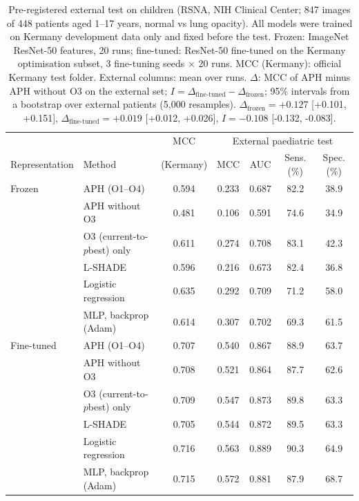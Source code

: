 \begin{table}[!t]
\centering
\caption{Pre-registered external test on children (RSNA, NIH Clinical Center; 847 images of 448 patients aged 1--17 years, normal vs lung opacity). All models were trained on Kermany development data only and fixed before the test. Frozen: ImageNet ResNet-50 features, 20 runs; fine-tuned: ResNet-50 fine-tuned on the Kermany optimisation subset, 3 fine-tuning seeds $\times$ 20 runs. MCC (Kermany): official Kermany test folder. External columns: mean over runs. $\Delta$: MCC of APH minus APH without O3 on the external set; $I=\Delta_{\mathrm{fine\text{-}tuned}}-\Delta_{\mathrm{frozen}}$; 95\% intervals from a bootstrap over external patients (5,000 resamples). $\Delta_{\mathrm{frozen}}=+0.127$ [+0.101, +0.151], $\Delta_{\mathrm{fine\text{-}tuned}}=+0.019$ [+0.012, +0.026], $I=-0.108$ [-0.132, -0.083].}
\label{tab:external}
\footnotesize
\setlength{\tabcolsep}{3pt}
\begin{tabular}{llccccc}
\toprule
 & & MCC & \multicolumn{4}{c}{External paediatric test} \\
Representation & Method & (Kermany) & MCC & AUC & Sens. (\%) & Spec. (\%) \\
\midrule
Frozen & APH (O1--O4) & 0.594 & 0.233 & 0.687 & 82.2 & 38.9 \\
 & APH without O3 & 0.481 & 0.106 & 0.591 & 74.6 & 34.9 \\
 & O3 (current-to-$p$best) only & 0.611 & 0.274 & 0.708 & 83.1 & 42.3 \\
 & L-SHADE & 0.596 & 0.216 & 0.673 & 82.4 & 36.8 \\
 & Logistic regression & 0.635 & 0.292 & 0.709 & 71.2 & 58.0 \\
 & MLP, backprop (Adam) & 0.614 & 0.307 & 0.702 & 69.3 & 61.5 \\
\midrule
Fine-tuned & APH (O1--O4) & 0.707 & 0.540 & 0.867 & 88.9 & 63.7 \\
 & APH without O3 & 0.708 & 0.521 & 0.864 & 87.7 & 62.6 \\
 & O3 (current-to-$p$best) only & 0.709 & 0.547 & 0.873 & 89.8 & 63.3 \\
 & L-SHADE & 0.705 & 0.544 & 0.872 & 89.5 & 63.3 \\
 & Logistic regression & 0.716 & 0.563 & 0.889 & 90.3 & 64.9 \\
 & MLP, backprop (Adam) & 0.715 & 0.572 & 0.881 & 87.9 & 68.7 \\
\bottomrule
\end{tabular}
\end{table}
